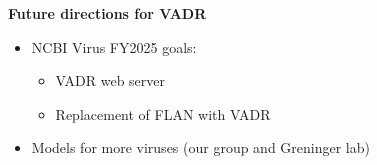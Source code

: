 \documentclass[landscape]{slides}
\begin{document}
\begin{slide}
\begin{center}
  \textbf{Future directions for VADR}
\end{center}

  \begin{itemize}
  \item NCBI Virus FY2025 goals: 
    \begin{itemize}
    \item VADR web server
    \item Replacement of FLAN with VADR
    \end{itemize}

  \item Models for more viruses (our group and Greninger lab)
  \end{itemize}
  \vfill

\end{slide}
\begin{slide}
\end{slide}
\end{document}
